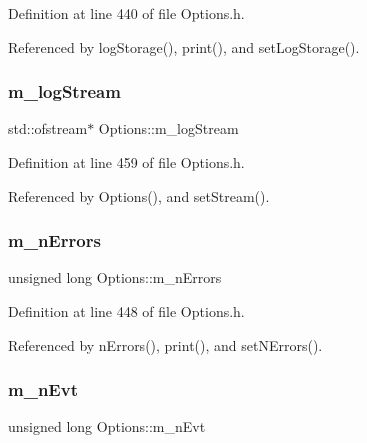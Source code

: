 Definition at line 440 of file Options.\+h.



Referenced by log\+Storage(), print(), and set\+Log\+Storage().

\mbox{\label{classOptions_a65c3a025880fb38373b599b87d600eef}} 
\subsubsection{\texorpdfstring{m\+\_\+log\+Stream}{m\_logStream}}
{\footnotesize\ttfamily std\+::ofstream$\ast$ Options\+::m\+\_\+log\+Stream\hspace{0.3cm}{\ttfamily [private]}}



Definition at line 459 of file Options.\+h.



Referenced by Options(), and set\+Stream().

\mbox{\label{classOptions_ae6460776ac3433103d88729a6811fc56}} 
\subsubsection{\texorpdfstring{m\+\_\+n\+Errors}{m\_nErrors}}
{\footnotesize\ttfamily unsigned long Options\+::m\+\_\+n\+Errors\hspace{0.3cm}{\ttfamily [private]}}



Definition at line 448 of file Options.\+h.



Referenced by n\+Errors(), print(), and set\+N\+Errors().

\mbox{\label{classOptions_a5e3bb1f2dfc4bf10cab08a33253cc4db}} 
\subsubsection{\texorpdfstring{m\+\_\+n\+Evt}{m\_nEvt}}
{\footnotesize\ttfamily unsigned long Options\+::m\+\_\+n\+Evt\hspace{0.3cm}{\ttfamily [private]}}



